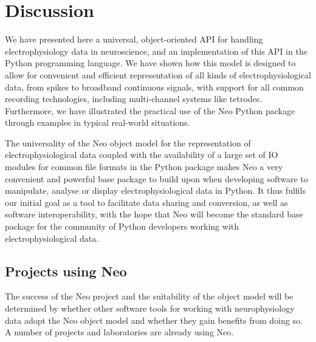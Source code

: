 \documentclass{frontiers}
\begin{document}
\section{Discussion}


We have presented here a universal, object-oriented API for handling electrophysiology data in neuroscience, and an implementation of this API in the Python programming language. 
We have shown how this model is designed to allow for convenient and efficient representation of all kinds of electrophysiological data, from spikes to broadband continuous signals, with support for all common recording technologies, including multi-channel systems like tetrodes.
Furthermore, we have illustrated the practical use of the Neo Python package through examples in typical real-world situations.

The universality of the Neo object model for the representation of electrophysiological data coupled with the availability of a large set of IO modules for common file formats in the Python package makes Neo a very convenient and powerful base package to build upon when developing software to manipulate, analyse or display electrophysiological data in Python.
It thus fulfils our initial goal as a tool to facilitate data sharing and conversion, as well as software interoperability, with the hope that Neo will become the standard base package for the community of Python developers working with electrophysiological data.

\subsection{Projects using Neo}

The success of the Neo project and the suitability of the object model will be determined by whether other software tools for working with neurophysiology data adopt the Neo object model and whether they gain benefits from doing so. A number of projects and laboratories are already using Neo.
\end{document}
